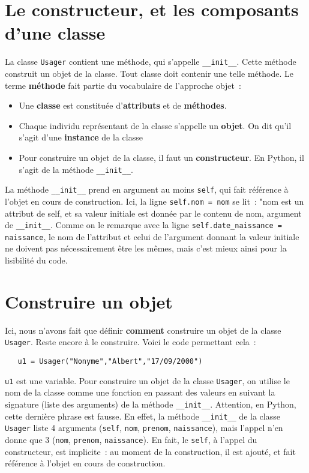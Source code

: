 \documentclass{article}
\begin{document}
\section{Le constructeur, et les composants d'une classe}

La classe \texttt{Usager} contient une méthode, qui s'appelle \texttt{\_\_init\_\_}. Cette méthode construit un objet de la classe. Tout classe doit contenir une telle méthode. Le terme \textbf{méthode} fait partie du vocabulaire de l'approche objet~:

\begin{itemize}
\item Une \textbf{classe} est constituée d'\textbf{attributs} et de \textbf{méthodes}.
\item Chaque individu représentant de la  classe s'appelle un \textbf{objet}. On dit qu'il s'agit d'une \textbf{instance} de la classe
\item Pour construire un objet de la classe, il faut un \textbf{constructeur}. En Python, il s'agit de la méthode  \texttt{\_\_init\_\_}. 
\end{itemize}

La méthode \texttt{\_\_init\_\_} prend en argument au moins \texttt{self}, qui fait référence à l'objet en cours de construction. Ici, la ligne \texttt{self.nom = nom} se lit~: "nom est un attribut de self, et sa valeur initiale est donnée par le contenu de nom, argument de \texttt{\_\_init\_\_}. Comme on le remarque avec la ligne \texttt{self.date\_naissance = naissance}, le nom de l'attribut et celui de l'argument donnant la valeur initiale ne doivent pas nécessairement être les mêmes, mais c'est mieux ainsi pour la lisibilité du code.

\section{Construire un objet}


Ici, nous n'avons fait que définir \textbf{comment} construire un objet de la classe \texttt{Usager}. Reste encore à le construire. Voici le code permettant cela~:

\begin{verbatim}
   u1 = Usager("Nonyme","Albert","17/09/2000")
\end{verbatim} 

\texttt{u1} est une variable. Pour construire un objet de la classe \texttt{Usager}, on utilise le nom de la classe comme une fonction en passant des valeurs en suivant la signature (liste des arguments) de la méthode \texttt{\_\_init\_\_}. Attention, en Python, cette dernière phrase est fausse. En effet, la méthode \texttt{\_\_init\_\_} de la classe \texttt{Usager} liste 4 arguments (\texttt{self}, \texttt{nom}, \texttt{prenom}, \texttt{naissance}), mais l'appel n'en donne que 3 (\texttt{nom}, \texttt{prenom}, \texttt{naissance}). En fait, le \texttt{self}, à l'appel du constructeur, est implicite~: au moment de la construction, il est ajouté, et fait référence à l'objet en cours de construction.
\end{document}
